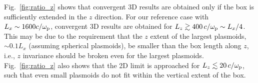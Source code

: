 \documentclass[twocolumn,twocolappendix]{aastex63}
\newcommand{\ls}{\textcolor{teal}}
\newcommand{\hz}{\textcolor{orange}}
\newcommand{\comp}{c/\omega_{\rm p}}
\begin{document}
Fig.~\ref{fig:ratio_z} shows that convergent 3D results are obtained only if the box is sufficiently extended in the $z$ direction. For our reference case with $L_x\sim 1600\comp$, convergent 3D results are obtained for $L_z\gtrsim 400\,\comp\sim L_x/4$. This may be due to the requirement that the $z$ extent of the largest plasmoids, $\sim 0.1 L_x$ (assuming spherical plasmoids), be smaller than the box length along $z$, i.e.,  $z$ invariance should be broken even for the largest plasmoids. Fig.~\ref{fig:ratio_z} also shows that the 2D limit is approached for $L_z\lesssim 20\,\comp$, such that even small plasmoids do not fit within the vertical extent of the box. 



\end{document}
